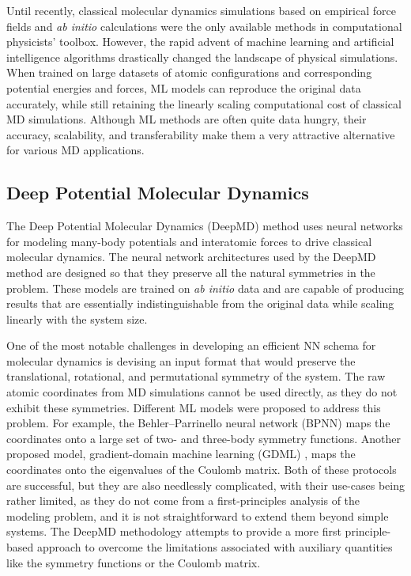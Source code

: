 Until recently, classical molecular dynamics simulations based on empirical
force fields and \textit{ab initio} calculations were the only available
methods in computational physicists' toolbox. However, the rapid advent of
machine learning and artificial intelligence algorithms drastically changed
the landscape of physical simulations. When trained on large datasets of
atomic configurations and corresponding potential energies and forces,
ML models can reproduce the original data accurately, while still retaining
the linearly scaling computational cost of classical MD simulations. Although
ML methods are often quite data hungry, their accuracy, scalability, and
transferability make them a very attractive alternative for various MD
applications.

\subsection{Deep Potential Molecular Dynamics}

The Deep Potential Molecular Dynamics (DeepMD) \parencite{Zhang_2018} method
uses neural networks for modeling many-body potentials and interatomic forces
to drive classical molecular dynamics. The neural network architectures used
by the DeepMD method are designed so that they preserve all the natural
symmetries in the problem. These models are trained on \textit{ab initio} data
and are capable of producing results that are essentially indistinguishable
from the original data while scaling linearly with the system size.

One of the most notable challenges in developing an efficient NN schema for
molecular dynamics is devising an input format that would preserve the
translational, rotational, and permutational symmetry of the system. The raw
atomic coordinates from MD simulations cannot be used directly, as they do not
exhibit these symmetries. Different ML models were proposed to address this
problem. For example, the Behler--Parrinello neural network (BPNN)
\parencite{PhysRevLett.98.146401} maps the coordinates onto a large set of
two- and three-body symmetry functions. Another proposed model,
gradient-domain machine learning (GDML)
\parencite{doi:10.1126/sciadv.1603015}, maps the coordinates onto the
eigenvalues of the Coulomb matrix. Both of these protocols are successful, but
they are also needlessly complicated, with their use-cases being rather
limited, as they do not come from a first-principles analysis of the modeling
problem, and it is not straightforward to extend them beyond simple systems.
The DeepMD methodology attempts to provide a more first principle-based
approach to overcome the limitations associated with auxiliary quantities like
the symmetry functions or the Coulomb matrix.

